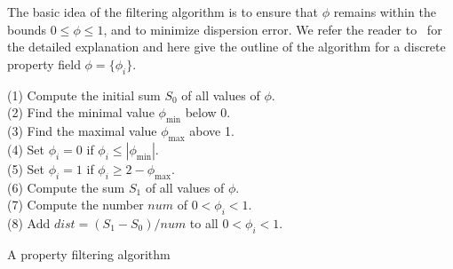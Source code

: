 The basic idea of the filtering algorithm is to ensure that $\phi$
remains within the bounds $0 \leqslant \phi \leqslant 1$, and to minimize
dispersion error.  We refer the reader to~\citet{LenardicKaula1993}
for the detailed explanation and here give the outline of the algorithm
for a discrete property field $\phi = \{\phi_i \}$.
\begin{algorithm}
  \begin{tabbing}
  (1) Compute the initial sum $S_0$ of all values of $\phi$. \\
  (2) Find the minimal value $\phi_{\min}$ below 0. \\
  (3) Find the maximal value $\phi_{\max}$ above 1. \\
  (4) Set $\phi_i = 0$ if $\phi_i \leqslant | \phi_{\min} |$. \\
  (5) Set $\phi_i = 1$ if $\phi_i \geqslant 2 - \phi_{\max} $. \\
  (6) Compute the sum $S_1$ of all values of $\phi$. \\
  (7) Compute the number $num$ of $0 < \phi_i < 1$. \\
  (8) Add $dist = (S_1 - S_0)/num$ to all $ 0 < \phi_i < 1$.
\end{tabbing}
\caption{A property filtering algorithm}
\label{vynnytska:alg:filtering}
\end{algorithm}


